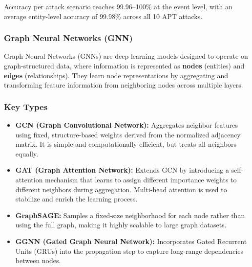 Accuracy per attack scenario reaches 99.96--100\% at the event level, with an average entity-level accuracy of 99.98\% across all 10 APT attacks.

\subsubsection{Graph Neural Networks (GNN)}


Graph Neural Networks (GNNs) are deep learning models designed to operate on
graph-structured data, where information is represented as \textbf{nodes}
(entities) and \textbf{edges} (relationships). They learn node representations
by aggregating and transforming feature information from neighboring nodes
across multiple layers.

\subsubsection{Key Types}

\begin{itemize}
    \item \textbf{GCN (Graph Convolutional Network):} Aggregates neighbor
    features using fixed, structure-based weights derived from the normalized
    adjacency matrix. It is simple and computationally efficient, but treats
    all neighbors equally.

    \item \textbf{GAT (Graph Attention Network):} Extends GCN by introducing
    a self-attention mechanism that learns to assign different importance
    weights to different neighbors during aggregation. Multi-head attention
    is used to stabilize and enrich the learning process.

    \item \textbf{GraphSAGE:} Samples a fixed-size neighborhood for each node
    rather than using the full graph, making it highly scalable to large
    graph datasets.

    \item \textbf{GGNN (Gated Graph Neural Network):} Incorporates Gated
    Recurrent Units (GRUs) into the propagation step to capture long-range
    dependencies between nodes.
\end{itemize}


